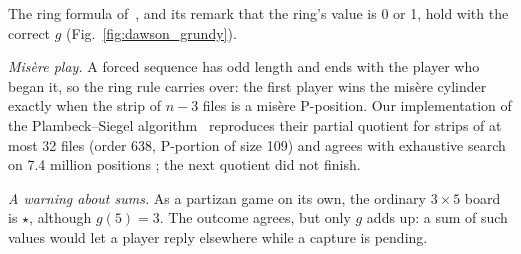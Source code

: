 The ring formula of~\cite{Study2025}, and its remark that the ring's value is 0 or 1, hold with the
correct $g$ (Fig.~\ref{fig:dawson_grundy}).

\emph{Mis\`ere play.} A forced sequence has odd length and ends with the player who began it, so the
ring rule carries over: the first player wins the mis\`ere cylinder exactly when the strip of $n-3$ files is
a mis\`ere P-position. Our implementation of the Plambeck--Siegel algorithm~\cite{PlambeckSiegel2008}
reproduces their partial quotient for strips of at most 32 files (order 638, P-portion of size 109) and agrees
with exhaustive search on 7.4 million positions ; the next quotient did not finish.

\emph{A warning about sums.} As a partizan game on its own, the ordinary $3\times5$ board is $\star$,
although $g(5)=3$. The outcome agrees, but only $g$ adds up: a sum of such values would let a player reply
elsewhere while a capture is pending.
